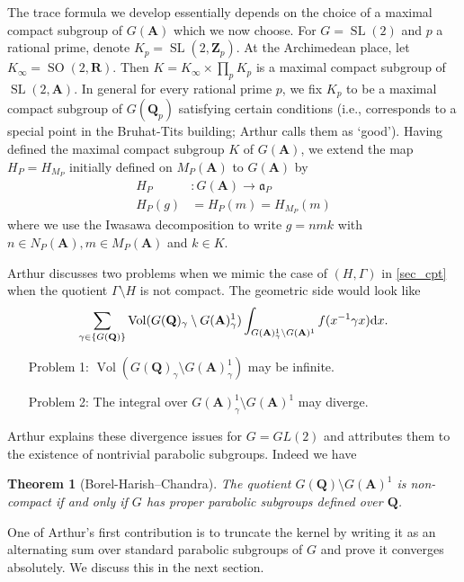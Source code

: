 \documentclass[11pt]{amsart}
\def\A{\mathbf A}
\def\Q{\mathbf Q}
\def\R{\mathbf R}
\def\Z{\mathbf Z}
\def\aaa{\mathfrak a}
\def\cb#1{{\color{blue}#1}}
\def\d{\text d}
\def\bs{\setminus} 			%
\def\sl{\operatorname{SL}}
\def\so{\operatorname{SO}}
\def\vol{\operatorname{Vol}}
\newtheorem{theorem}{Theorem}[section]
\theoremstyle{remark}
\begin{document}
The trace formula we develop essentially depends on the choice of a maximal compact subgroup of $G(\A)$ which we now choose. \cb{For $G = \sl(2)$ and $p$ a rational prime, denote $K_p = \sl(2, \Z_p)$. At the Archimedean place, let $K_\infty = \so(2, \R)$. Then $K = K_\infty \times \prod_p K_p$ is a maximal compact subgroup of $\sl(2, \A)$.} In general for every rational prime $p$, we fix $K_p$ to be a maximal compact subgroup of $G(\Q_p)$ satisfying certain conditions (i.e., corresponds to a special point in the Bruhat-Tits building; Arthur calls them as `good'). Having defined the maximal compact subgroup $K$ of $G(\A)$, we extend the map $H_P = H_{M_P}$ initially defined on $M_P(\A)$ to $G(\A)$ by
\begin{align*}
	H_P & : G(\A) \to \aaa_P \\
	H_P(g) & = H_P(m) = H_{M_P}(m)
\end{align*} 
where we use the Iwasawa decomposition to write $g = nmk$ with $n \in N_P(\A), m \in M_P(\A)$ and $k \in K$. 

Arthur discusses two problems when we mimic the case of $(H, \Gamma)$ in \cref{sec_cpt} when the quotient $\Gamma\bs H$ is not compact. The geometric side would look like 
\[ \sum_{\gamma \in \{G(\Q)\}} \vol(G(\Q)_\gamma\bs G(\A)_\gamma^1) \int_{G(\A)^1_\gamma \bs G(\A)^1} f(x^{-1}\gamma x) \d x.\]

\begin{itemize}
\item[Problem 1:] $\vol(G(\Q)_\gamma\bs G(\A)_\gamma^1)$ may be infinite. 
\item[Problem 2:] The integral over $G(\A)^1_\gamma \bs G(\A)^1$ may diverge. 
\end{itemize}

Arthur explains these divergence issues for $G = GL(2)$ and attributes them to the existence of nontrivial parabolic subgroups. Indeed we have

\begin{theorem} [Borel-Harish--Chandra]
The quotient $G(\Q)\bs G(\A)^1$ is non-compact if and only if $G$ has proper parabolic subgroups defined over $\Q$. 
\end{theorem}

One of Arthur's first contribution is to truncate the kernel by writing it as an alternating sum over standard parabolic subgroups of $G$ and prove it converges absolutely. We discuss this in the next section. 

\end{document}

